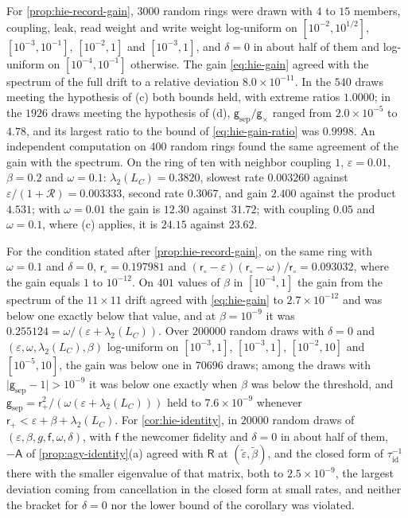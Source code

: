 \begin{numcheck}\label{chk:hie-record-drift}
For \cref{prop:hie-record-gain}, $3000$ random rings were drawn with $4$ to $15$ members, coupling, leak, read weight and write weight log-uniform on $[10^{-2},10^{1/2}]$, $[10^{-3},10^{-1}]$, $[10^{-2},1]$ and $[10^{-3},1]$, and $\delta=0$ in about half of them and log-uniform on $[10^{-4},10^{-1}]$ otherwise. The gain \eqref{eq:hie-gain} agreed with the spectrum of the full drift to a relative deviation $8.0\times10^{-11}$. In the $540$ draws meeting the hypothesis of (c) both bounds held, with extreme ratios $1.0000$; in the $1926$ draws meeting the hypothesis of (d), $\mathsf g_{\mathrm{sep}}/\mathsf g_\times$ ranged from $2.0\times10^{-5}$ to $4.78$, and its largest ratio to the bound of \eqref{eq:hie-gain-ratio} was $0.9998$. An independent computation on $400$ random rings found the same agreement of the gain with the spectrum. On the ring of ten with neighbor coupling $1$, $\varepsilon=0.01$, $\beta=0.2$ and $\omega=0.1$: $\lambda_2(L_C)=0.3820$, slowest rate $0.003260$ against $\varepsilon/(1+\mathcal R)=0.003333$, second rate $0.3067$, and gain $2.400$ against the product $4.531$; with $\omega=0.01$ the gain is $12.30$ against $31.72$; with coupling $0.05$ and $\omega=0.1$, where (c) applies, it is $24.15$ against $23.62$.

For the condition stated after \cref{prop:hie-record-gain}, on the same ring with $\omega=0.1$ and $\delta=0$, $\mathsf r_\circ=0.197981$ and $(\mathsf r_\circ-\varepsilon)(\mathsf r_\circ-\omega)/\mathsf r_\circ=0.093032$, where the gain equals $1$ to $10^{-12}$. On $401$ values of $\beta$ in $[10^{-4},1]$ the gain from the spectrum of the $11\times11$ drift agreed with \eqref{eq:hie-gain} to $2.7\times10^{-12}$ and was below one exactly below that value, and at $\beta=10^{-9}$ it was $0.255124=\omega/(\varepsilon+\lambda_2(L_C))$. Over $200000$ random draws with $\delta=0$ and $(\varepsilon,\omega,\lambda_2(L_C),\beta)$ log-uniform on $[10^{-3},1]$, $[10^{-3},1]$, $[10^{-2},10]$ and $[10^{-5},10]$, the gain was below one in $70696$ draws; among the draws with $\lvert\mathsf g_{\mathrm{sep}}-1\rvert>10^{-9}$ it was below one exactly when $\beta$ was below the threshold, and $\mathsf g_{\mathrm{sep}}=\mathsf r_+^2/(\omega(\varepsilon+\lambda_2(L_C)))$ held to $7.6\times10^{-9}$ whenever $\mathsf r_+<\varepsilon+\beta+\lambda_2(L_C)$. For \cref{cor:hie-identity}, in $20000$ random draws of $(\varepsilon,\beta,g,\mathsf f,\omega,\delta)$, with $\mathsf f$ the newcomer fidelity and $\delta=0$ in about half of them, $-\mathsf A$ of \cref{prop:agy-identity}(a) agreed with $\mathsf R$ at $(\tilde\varepsilon,\tilde\beta)$, and the closed form of $\tau_{\mathrm{id}}^{-1}$ there with the smaller eigenvalue of that matrix, both to $2.5\times10^{-9}$, the largest deviation coming from cancellation in the closed form at small rates, and neither the bracket for $\delta=0$ nor the lower bound of the corollary was violated.


\end{numcheck}
